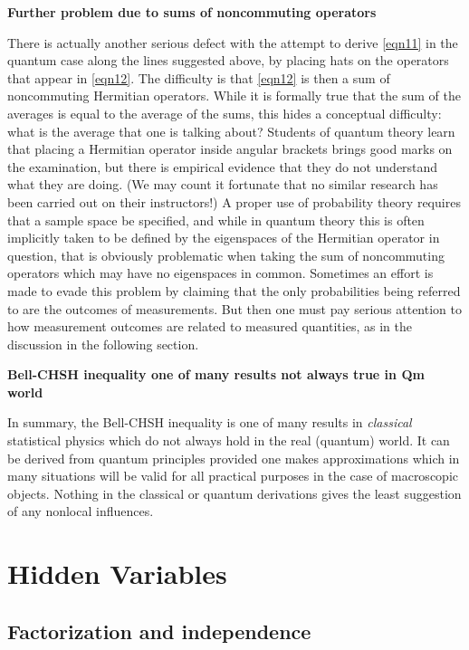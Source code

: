 \documentclass[10pt]{article} %
\def\outl#1{\par{\medskip\noindent\hspace*{.5cm}\bf
      \mathversion{bold}#1\mathversion{normal}\smallskip} }
\def\np{} \def\xa{} \def\xb{} \def\xn{} \def\xp{}
\def\outl#1{} \def\np{} \def\xa{} \def\xb{} \def\xn{} \def\xp{}
\def\outl#1{\par{\medskip\noindent\hspace*{.5cm}\bf
      \mathversion{bold}#1\mathversion{normal}\smallskip} }
\def\np{\newpage }\def\xn{\nopagebreak }\def\xp{\pagebreak }
\begin{document}
\xb
\outl{Further problem due to sums of noncommuting operators}
\xa


There is actually another serious defect with the attempt to derive
\eqref{eqn11} in the quantum case along the lines suggested above, by placing
hats on the operators that appear in \eqref{eqn12}.  The difficulty is that
\eqref{eqn12} is then a sum of noncommuting Hermitian operators.  While it is
formally true that the sum of the averages is equal to the average of the
sums, this hides a conceptual difficulty: what is the average that one is
talking about?  Students of quantum theory learn that placing a Hermitian
operator inside angular brackets brings good marks on the examination, but
there is empirical evidence \cite{SnBC06} that they do not understand
what they are doing. (We may count it fortunate that no similar research has
been carried out on their instructors!)  A proper use of probability theory
requires that a sample space be specified, and while in quantum theory this is
often implicitly taken to be defined by the eigenspaces of the Hermitian
operator in question, that is obviously problematic when taking the sum of
noncommuting operators which may have no eigenspaces in common.  Sometimes an
effort is made to evade this problem by claiming that the only probabilities
being referred to are the outcomes of measurements. But then one must pay
serious attention to how measurement outcomes are related to measured
quantities, as in the discussion in the following section. 

\xb
\outl{Bell-CHSH inequality one of many results not always true in Qm world}
\xa

In summary, the Bell-CHSH inequality is one of many results in
\emph{classical} statistical physics which do not always hold in the real
(quantum) world.  It can be derived from quantum principles provided one makes
approximations which in many situations will be valid for all practical
purposes in the case of macroscopic objects.  Nothing in the classical or
quantum derivations gives the least suggestion of any nonlocal influences.

\xb
\section{Hidden Variables}
\label{sct5}
\xa

\xb
\subsection{Factorization and independence}
\label{sct5a}
\xa
\end{document}
